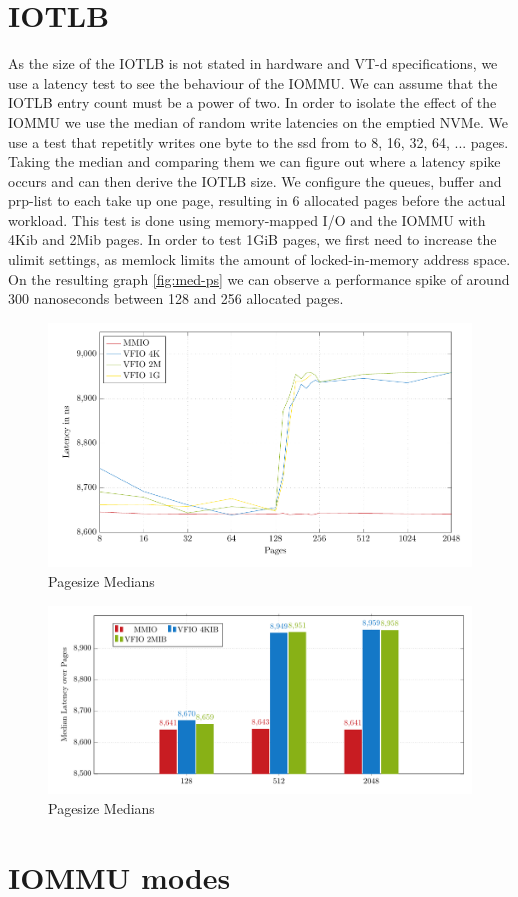\section{IOTLB}
As the size of the IOTLB is not stated in hardware and VT-d specifications, we use a latency test to see the behaviour of the IOMMU. We can assume that the IOTLB entry count must be a power of two. In order to isolate the effect of the IOMMU we use the median of random write latencies on the emptied NVMe. We use a test that repetitly writes one byte to the ssd from to 8, 16, 32, 64, ... pages. Taking the median and comparing them we can figure out where a latency spike occurs and can then derive the IOTLB size. We configure the queues, buffer and prp-list to each take up one page, resulting in 6 allocated pages before the actual workload. This test is done using memory-mapped I/O and the IOMMU with 4Kib and 2Mib pages.
In order to test 1GiB pages, we first need to increase the ulimit settings, as memlock limits the amount of locked-in-memory address space.
On the resulting graph \autoref{fig:med-ps} we can observe a performance spike of around 300 nanoseconds between 128 and 256 allocated pages.

\begin{figure}
    \centering
    \includegraphics[width=\textwidth]{figures/latency_ps_medians_full}
    \caption{Pagesize Medians}
    \label{fig:med-ps}
\end{figure}

\begin{figure}
    \centering
    \includegraphics[width=\textwidth]{figures/latency_ps_medians_bar}
    \caption{Pagesize Medians}
    \label{fig:med-ps-bar}
\end{figure}

\section{IOMMU modes}